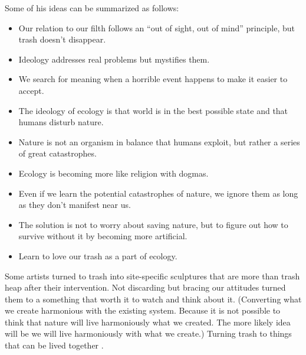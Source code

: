 
Some of his ideas can be summarized as follows:
\begin{itemize}
\item Our relation to our filth follows an “out of sight, out of mind” principle, but trash doesn’t disappear.
\item Ideology addresses real problems but mystifies them.
\item We search for meaning when a horrible event happens to make it easier to accept.
\item The ideology of ecology is that world is in the best possible state and that humans disturb nature.
\item Nature is not an organism in balance that humans exploit, but rather a series of great catastrophes.
\item Ecology is becoming more like religion with dogmas.
\item Even if we learn the potential catastrophes of nature, we ignore them as long as they don’t manifest near us.
\item The solution is not to worry about saving nature, but to figure out how to survive without it by becoming more artificial.
\item Learn to love our trash as a part of ecology.
\end{itemize}

Some artists turned to trash into site-specific sculptures that are more than trash heap after their intervention. Not discarding but bracing our attitudes turned them to a something that worth it to watch and think about it. (Converting what we create harmonious with the existing system. Because it is not possible to think that nature will live harmoniously what we created. The more likely idea will be we will live harmoniously with what we create.) Turning trash to things that can be lived together .



